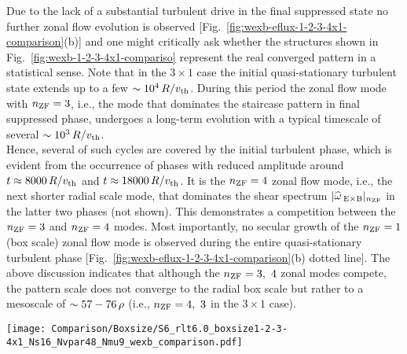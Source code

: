 Due to the lack of a substantial turbulent drive in the final suppressed state no further zonal flow evolution is observed [Fig.~\ref{fig:wexb-eflux-1-2-3-4x1-comparison}(b)] and one might critically ask whether the structures shown in Fig.~\ref{fig:wexb-1-2-3-4x1-compariso} represent the real converged pattern in a statistical sense. 
Note that in the $3 \times 1$ case the initial quasi-stationary turbulent state extends up to a few $\sim 10^4\,R/v_{\mathrm{th}}$.
During this period the zonal flow mode with $n_\mathrm{ZF} = 3$, i.e., the mode that dominates the staircase pattern in final suppressed phase, undergoes a long-term evolution with a typical timescale of several $\sim 10^3\,R/v_{\mathrm{th}}$. \\
Hence, several of such cycles are covered by the initial turbulent phase, which is evident from the occurrence of phases with reduced amplitude around $t \approx 8000\,R/v_{\mathrm{th}}$ and $t \approx 18000\,    R/v_{\mathrm{th}}$.
It is the $n_\mathrm{ZF} = 4$ zonal flow mode, i.e., the next shorter radial scale mode, that dominates the shear spectrum $|\widehat{\omega}_{\mathrm{\:E \times B}}|_{n_\mathrm{ZF}}$ in the latter two phases (not shown). This demonstrates a competition between the $n_\mathrm{ZF} = 3$ and $n_\mathrm{ZF} = 4$ modes.
Most importantly, no secular growth of the $n_\mathrm{ZF} = 1$ (box scale) zonal flow mode is observed during the entire quasi-stationary turbulent phase [Fig.~\ref{fig:wexb-eflux-1-2-3-4x1-comparison}(b) dotted line].
The above discussion indicates that although the $n_\mathrm{ZF} = 3,~4$ zonal modes compete, the pattern scale does not converge to the radial box scale but rather to a mesoscale of $\sim 57 - 76\,\rho$ (i.e., $n_\mathrm{ZF} = 4,~3$ in the $3\times1$ case). 

\begin{center}
	\captionsetup{type=figure}
	\texttt{[image: Comparison/Boxsize/S6\_rlt6.0\_boxsize1-2-3-4x1\_Ns16\_Nvpar48\_Nmu9\_wexb\_comparison.pdf]}
	\label{fig:wexb-1-2-3-4x1-compariso}
\end{center}

